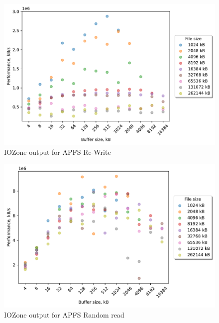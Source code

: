 \begin{figure}[!htb]
	\label{fig:bench_apfs_re_write}
	\begin{center}
		\includegraphics[width=1.0\textwidth]{figures/benchmarking/local/Re-Write.pdf}
	\end{center}
	\caption{IOZone output for \gls{APFS} \mbox{Re-Write}}
\end{figure}

\begin{figure}[!htb]
	\label{fig:bench_apfs_rnd_read}
	\begin{center}
		\includegraphics[width=1.0\textwidth]{figures/benchmarking/local/Random read.pdf}
	\end{center}
	\caption{IOZone output for \gls{APFS} Random read}
\end{figure}

